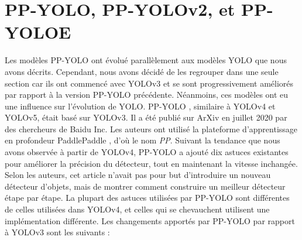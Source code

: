 \documentclass{article}
\begin{document}
\section{PP-YOLO, PP-YOLOv2, et PP-YOLOE}
Les modèles PP-YOLO ont évolué parallèlement aux modèles YOLO que nous avons décrits. Cependant, nous avons décidé de les regrouper dans une seule section car ils ont commencé avec YOLOv3 et se sont progressivement améliorés par rapport à la version PP-YOLO précédente. Néanmoins, ces modèles ont eu une influence sur l'évolution de YOLO. PP-YOLO \cite{76}, similaire à YOLOv4 et YOLOv5, était basé sur YOLOv3. Il a été publié sur ArXiv en juillet 2020 par des chercheurs de Baidu Inc. Les auteurs ont utilisé la plateforme d'apprentissage en profondeur PaddlePaddle \cite{101}, d'où le nom \textit{PP}. Suivant la tendance que nous avons observée à partir de YOLOv4, PP-YOLO a ajouté dix astuces existantes pour améliorer la précision du détecteur, tout en maintenant la vitesse inchangée. Selon les auteurs, cet article n'avait pas pour but d'introduire un nouveau détecteur d'objets, mais de montrer comment construire un meilleur détecteur étape par étape. La plupart des astuces utilisées par PP-YOLO sont différentes de celles utilisées dans YOLOv4, et celles qui se chevauchent utilisent une implémentation différente. Les changements apportés par PP-YOLO par rapport à YOLOv3 sont les suivants :
\end{document}

